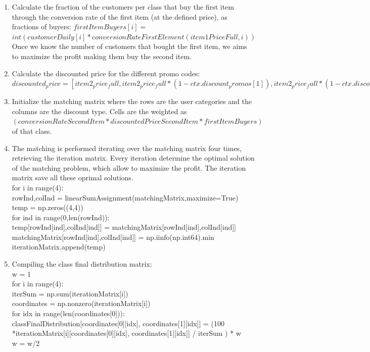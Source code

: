 \begin{enumerate}
	\item Calculate the fraction of the customers per class that buy the first item through the conversion rate of the first item (at the defined price), as fractions of buyers: $firstItemBuyers[i]=$\\
	$int (customerDaily[i] * conversionRateFirstElement(item1PriceFull, i))$\\
	Once we know the number of customers that bought the first item, we aims to maximize the profit making them buy the second item.
	\item Calculate the discounted price for the different promo codes: $discounted_price = [item2_price_full, item2_price_full*(1-ctx.discount_promos[1]),	item2_price_full*(1-ctx.discount_promos[2]),item2_price_full*(1-ctx.discount_promos[3])]$
	\item Initialize the matching matrix where the rows are the user categories and the columns are the discount type. Cells are the weighted as $(conversionRateSecondItem * discountedPriceSecondItem * firstItemBuyers)$ of that class.
	\item The matching is performed iterating over the matching matrix four times, retrieving the iteration matrix. Every iteration determine the optimal solution of the matching problem, which allow to maximize the profit. The iteration matrix save all these oprimal solutions.\\
	
	for i in range(4):\\
	\tabto{0.6cm} rowInd,colInd = linearSumAssignment(matchingMatrix,maximize=True)\\
	\tabto{0.6cm} temp = np.zeros((4,4))\\
	\tabto{0.6cm}for ind in range(0,len(rowInd)):\\
	\tabto{1.2cm}temp[rowInd[ind],colInd[ind]] =  matchingMatrix[rowInd[ind],colInd[ind]]\\
	\tabto{1.2cm}matchingMatrix[rowInd[ind],colInd[ind]] = np.iinfo(np.int64).min \\
	\tabto{0.6cm}iterationMatrix.append(temp)
	\item Compiling the class final distribution matrix:\\
	w = 1\\
	for i in range(4):\\
	\tabto{0.6cm}iterSum = np.sum(iterationMatrix[i])\\
	\tabto{0.6cm}coordinates = np.nonzero(iterationMatrix[i])\\
	\tabto{0.6cm}for idx in range(len(coordinates[0])):\\
	\tabto{1.2cm}classFinalDistribution[coordinates[0][idx], coordinates[1][idx]] =
	\tabto{1.2cm}(100 *iterationMatrix[i][coordinates[0][idx], coordinates[1][idx]] /
	\tabto{1.2cm} iterSum ) * w\\
	\tabto{0.6cm}w = w/2\\
	

\end{enumerate}
